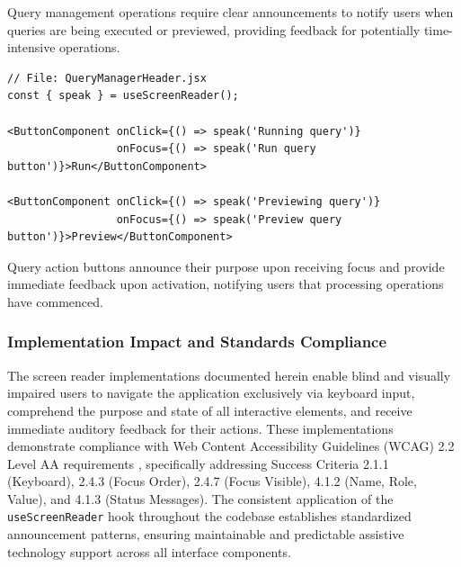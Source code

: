 Query management operations require clear announcements to notify users when queries are being executed or previewed, providing feedback for potentially time-intensive operations.

\begin{lstlisting}[caption={Query action button announcements}, label={lst:query-sr}]
// File: QueryManagerHeader.jsx
const { speak } = useScreenReader();

<ButtonComponent onClick={() => speak('Running query')}
                 onFocus={() => speak('Run query button')}>Run</ButtonComponent>

<ButtonComponent onClick={() => speak('Previewing query')}
                 onFocus={() => speak('Preview query button')}>Preview</ButtonComponent>
\end{lstlisting}

Query action buttons announce their purpose upon receiving focus and provide immediate feedback upon activation, notifying users that processing operations have commenced.

\subsubsection{Implementation Impact and Standards Compliance}

The screen reader implementations documented herein enable blind and visually impaired users to navigate the application exclusively via keyboard input, comprehend the purpose and state of all interactive elements, and receive immediate auditory feedback for their actions. These implementations demonstrate compliance with Web Content Accessibility Guidelines (WCAG) 2.2 Level AA requirements \cite{WCAG22}, specifically addressing Success Criteria 2.1.1 (Keyboard), 2.4.3 (Focus Order), 2.4.7 (Focus Visible), 4.1.2 (Name, Role, Value), and 4.1.3 (Status Messages). The consistent application of the \texttt{useScreenReader} hook throughout the codebase establishes standardized announcement patterns, ensuring maintainable and predictable assistive technology support across all interface components.
